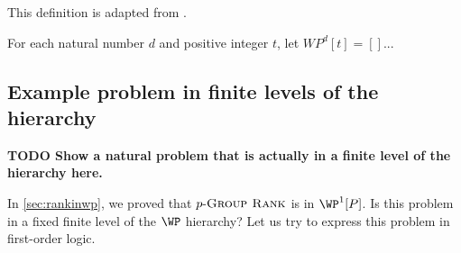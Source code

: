 \documentclass{article}
\newcommand{\todo}[1]{\textbf{TODO #1}}
\newcommand{\dash}{\textnormal{-}}
\newcommand{\pgrouprank}{p\dash\textsc{Group Rank}}
\begin{document}
This definition is adapted from \autocite[Definition~5.1]{fg06}.

\begin{definition}
  For each natural number $d$ and positive integer $t$, let $WP^d[t] = []$...
\end{definition}




\subsection{Example problem in finite levels of the hierarchy}

\todo{Show a natural problem that is actually in a finite level of the hierarchy here.}

In \autoref{sec:rankinwp}, we proved that $\pgrouprank$ is in $\WP^1[P]$.
Is this problem in a fixed finite level of the $\WP$ hierarchy?
Let us try to express this problem in first-order logic.
\end{document}
